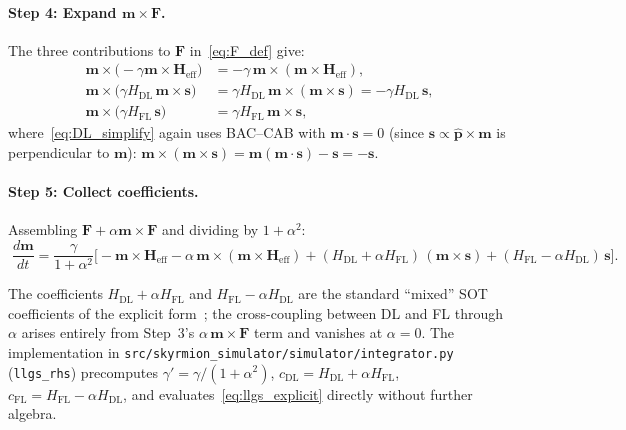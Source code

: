 \documentclass[11pt,a4paper]{article}
\newcommand{\mb}[1]{\mathbf{#1}}
\newcommand{\phat}{\hat{\mb{p}}}
\newcommand{\Heff}{\mb{H}_{\text{eff}}}
\begin{document}
\paragraph{Step 4: Expand $\mb{m}\times\mb{F}$.}
The three contributions to $\mb{F}$ in~\eqref{eq:F_def} give:
%
\begin{align}
\mb{m}\times\big(-\gamma\mb{m}\times\Heff\big)
    &= -\gamma\,\mb{m}\times(\mb{m}\times\Heff), \\
\mb{m}\times\big(\gamma H_{\text{DL}}\,\mb{m}\times\mb{s}\big)
    &= \gamma H_{\text{DL}}\,\mb{m}\times(\mb{m}\times\mb{s})
     = -\gamma H_{\text{DL}}\,\mb{s},
        \label{eq:DL_simplify}\\
\mb{m}\times\big(\gamma H_{\text{FL}}\,\mb{s}\big)
    &= \gamma H_{\text{FL}}\,\mb{m}\times\mb{s},
\end{align}
%
where~\eqref{eq:DL_simplify} again uses BAC--CAB with
$\mb{m}\cdot\mb{s}=0$ (since $\mb{s}\propto\phat\times\mb{m}$ is
perpendicular to $\mb{m}$):
$\mb{m}\times(\mb{m}\times\mb{s}) = \mb{m}(\mb{m}\cdot\mb{s})
- \mb{s} = -\mb{s}$.

\paragraph{Step 5: Collect coefficients.}
Assembling $\mb{F} + \alpha\mb{m}\times\mb{F}$ and dividing by
$1+\alpha^2$:
%
\begin{equation}\label{eq:llgs_explicit}
\boxed{\;
\frac{d\mb{m}}{dt}
    = \frac{\gamma}{1 + \alpha^2} \Big[
        -\mb{m}\times\Heff
        - \alpha\,\mb{m}\times(\mb{m}\times\Heff)
        + (H_{\text{DL}} + \alpha H_{\text{FL}})\,(\mb{m}\times\mb{s})
        + (H_{\text{FL}} - \alpha H_{\text{DL}})\,\mb{s}
    \Big].
\;}
\end{equation}

The coefficients $H_{\text{DL}} + \alpha H_{\text{FL}}$ and
$H_{\text{FL}} - \alpha H_{\text{DL}}$ are the standard
``mixed'' SOT coefficients of the explicit
form~\cite{khvalkovskiy2013}; the cross-coupling between DL and FL
through $\alpha$ arises entirely from
Step~3's $\alpha\,\mb{m}\times\mb{F}$ term and vanishes at $\alpha=0$.
%
The implementation in \texttt{src/skyrmion\_simulator/simulator/integrator.py}
(\texttt{llgs\_rhs}) precomputes
$\gamma' = \gamma/(1+\alpha^2)$,
$c_{\text{DL}} = H_{\text{DL}} + \alpha H_{\text{FL}}$,
$c_{\text{FL}} = H_{\text{FL}} - \alpha H_{\text{DL}}$,
and evaluates~\eqref{eq:llgs_explicit} directly without further
algebra.

\end{document}
